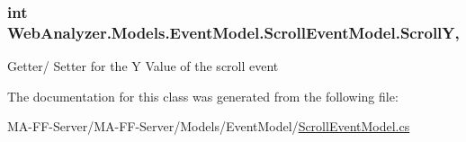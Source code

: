 \subsubsection[{Scroll\+Y}]{\setlength{\rightskip}{0pt plus 5cm}int Web\+Analyzer.\+Models.\+Event\+Model.\+Scroll\+Event\+Model.\+Scroll\+Y\hspace{0.3cm}{\ttfamily [get]}, {\ttfamily [set]}}\label{class_web_analyzer_1_1_models_1_1_event_model_1_1_scroll_event_model_a3e94660e7ec7eb2af5fc06022fbddbcd}


Getter/ Setter for the Y Value of the scroll event 



The documentation for this class was generated from the following file\+:\begin{DoxyCompactItemize}
\item 
M\+A-\/\+F\+F-\/\+Server/\+M\+A-\/\+F\+F-\/\+Server/\+Models/\+Event\+Model/\hyperlink{_scroll_event_model_8cs}{Scroll\+Event\+Model.\+cs}\end{DoxyCompactItemize}
